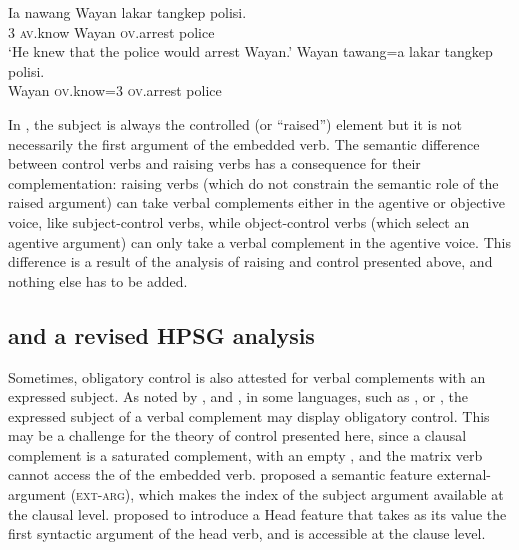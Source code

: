 \ex
\label{ov}
\gll Ia nawang           Wayan lakar  tangkep            polisi.\\
     3  \textsc{av}.know Wayan \FUT{} \textsc{ov}.arrest police\\
\glt `He knew that the police would arrest Wayan.'
\ex
\label{rais-ov}
\gll Wayan tawang=a           lakar  tangkep            polisi. \\
     Wayan \textsc{ov}.know=3 \FUT{} \textsc{ov}.arrest police\\ 
\zl


In , the subject is always the controlled (or ``raised'') element but it is not
necessarily the first argument of the embedded verb. The semantic difference between control verbs
and raising verbs has a consequence for their complementation: raising verbs (which do not constrain
the semantic role of the raised argument) can take verbal complements either in the agentive or
objective voice, like subject-control verbs, while object-control verbs (which select an agentive argument) can only take a
verbal complement in the agentive voice. This difference is a result of the analysis of raising and
control presented above, and nothing else has to be added.



\subsection{\xarg and a revised HPSG analysis}\label{section-xarg}

Sometimes, obligatory control is also attested for verbal complements with an expressed subject.  As
noted by \citet{Zec87a-u}, \citet{Farkas1988} and \citet[--116]{GH2001a-u}, in some languages, such
as ,  \citep{Kuno76a-u,Iida96a-u} or  \citep{Karimi2008},
the expressed subject of a verbal complement may display obligatory control. This may be a challenge
for the theory of control presented here, since a clausal complement is a saturated complement, with
an empty \subjl, and the matrix verb cannot access the \subjv of the embedded verb. \citet[]{SP91a-u} proposed a semantic feature external-argument (\textsc{ext-arg}), which makes the index of the
subject argument available at the clausal level.  \citet{Sag2007a}\addpages proposed to introduce a Head
feature \xarg that takes as its value the first syntactic argument of the head verb, and is
accessible at the clause level.

